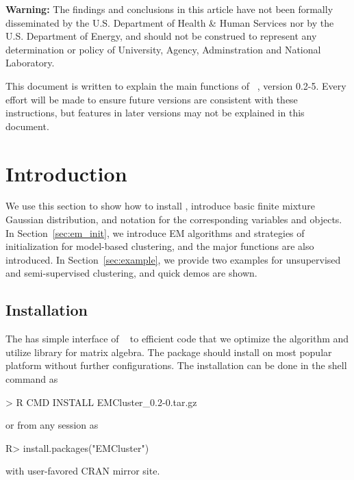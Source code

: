
{\color{red} \bf Warning:}
The findings and conclusions in this article have not been
formally disseminated by the U.S. Department of Health \& Human Services
nor by the U.S. Department of Energy,
and should not be construed to represent any determination or
policy of University, Agency, Adminstration and National Laboratory.

This document is written to explain the main
functions of ~\citep{Chen2015EMClusterpackage}, version 0.2-5.
Every effort will be made to ensure future versions are consistent with
these instructions, but features in later versions may not be explained
in this document.




\section[Introduction]{Introduction}
\label{sec:introduction}

We use this section to show how to install ,
introduce basic finite mixture Gaussian distribution,
and notation for the corresponding variables and objects.
In Section~\ref{sec:em_init}, we introduce EM algorithms and
strategies of initialization for model-based clustering, and
the major  functions are also introduced.
In Section~\ref{sec:example}, we provide two
examples for unsupervised and semi-supervised clustering,
and quick demos are shown.


\subsection[Installation]{Installation}
The  has simple interface of ~\citep{Rcore}
to efficient  code that we optimize the algorithm and
utilize  library for matrix algebra. The package should install
on most popular platform without further configurations. The installation
can be done in the shell command as
\begin{Command}
> R CMD INSTALL EMCluster_0.2-0.tar.gz
\end{Command}
or from any  session as
\begin{Command}
R> install.packages("EMCluster") 
\end{Command}
with user-favored CRAN mirror site.


